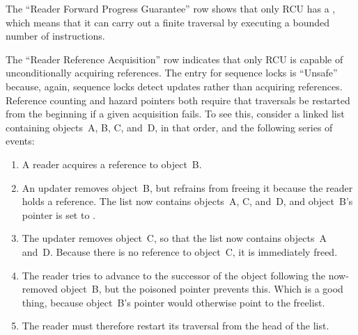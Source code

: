 \QuickQuizEnd

The ``Reader Forward Progress Guarantee'' row shows that only RCU
has a 
, which means that
it can carry out a finite traversal by executing a bounded number of
instructions.

The ``Reader Reference Acquisition'' row indicates that only RCU is
capable of unconditionally acquiring references.
The entry for sequence locks is ``Unsafe'' because, again, sequence locks
detect updates rather than acquiring references.
Reference counting and hazard pointers both require that traversals be
restarted from the beginning if a given acquisition fails.
To see this, consider a linked list containing objects~A, B, C, and~D,
in that order, and the following series of events:

\begin{enumerate}
\item	A reader acquires a reference to object~B.
\item	An updater removes object~B, but refrains from freeing it because
	the reader holds a reference.
	The list now contains objects~A, C, and~D, and
	object~B's  pointer is set to .
\item	The updater removes object~C, so that the list now contains
	objects~A and~D\@.
	Because there is no reference to object~C, it is immediately freed.
\item	The reader tries to advance to the successor of the object
	following the now-removed object~B, but the poisoned
	 pointer prevents this.
	Which is a good thing, because object~B's  pointer
	would otherwise point to the freelist.
\item	The reader must therefore restart its traversal from the head
	of the list.
\end{enumerate}

